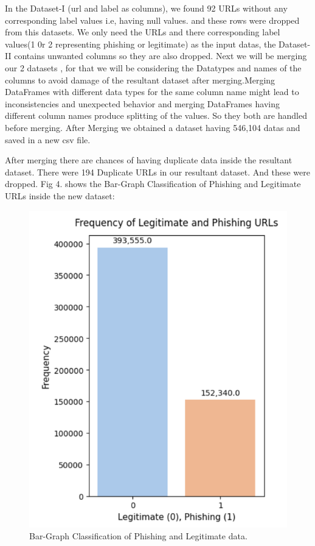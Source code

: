 \documentclass[conference]{IEEEtran}
\begin{document}
\par In the Dataset-I (url and label as columns), we found 92 URLs without any corresponding label values i.e, having null values. and these rows were dropped from this datasets. We only need the URLs and there corresponding label values(1 0r 2 representing phishing or legitimate) as the input datas, the Dataset-II contains unwanted columns so they are also dropped. Next we will be merging our 2 datasets , for that we will be considering the Datatypes and names of the columns to avoid damage of the resultant dataset after merging.Merging DataFrames with different data types for the same column name might lead to inconsistencies and unexpected behavior and merging DataFrames having different column names produce splitting of the values. So they both are handled before merging. After Merging we obtained a dataset having 546,104 datas and saved in a new csv file.
\par After merging there are chances of having duplicate data inside the resultant dataset. There were 194 Duplicate URLs in our resultant dataset. And these were dropped. Fig 4. shows the 
Bar-Graph Classification of Phishing and Legitimate URLs inside the new dataset:

\begin{figure}[H] 
  \centering
  \includegraphics[scale=0.4]{total frequency.png} 
  \caption{Bar-Graph Classification of Phishing and Legitimate data.}
  \label{fig}
\end{figure}
\end{document}
